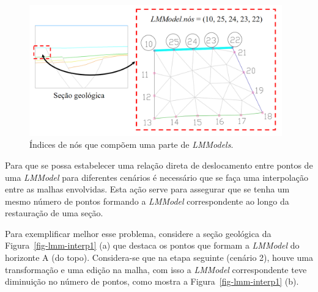 \begin{figure} [H]
  \begin{center}
    \includegraphics[width=310pt]{images/fig-lmm-mesh-boundary}
    \caption{Índices de nós que compõem uma parte de \textit{LMModels}.}\label{fig-lmm-mesh-boundary}
  \end{center}
\end{figure}

Para que se possa estabelecer uma relação direta de deslocamento entre pontos de uma \textit{LMModel} para diferentes cenários é necessário que se faça uma interpolação entre as malhas envolvidas. Esta ação serve para assegurar que se tenha um mesmo número de pontos formando a \textit{LMModel} correspondente ao longo da restauração de uma seção.

Para exemplificar melhor esse problema, considere a seção geológica da Figura~\ref{fig-lmm-interp1} (a) que destaca os pontos que formam a \textit{LMModel} do horizonte A (do topo). Considera-se que na etapa seguinte (cenário 2), houve uma transformação e uma edição na malha, com isso a \textit{LMModel} correspondente teve diminuição no número de pontos, como mostra a Figura~\ref{fig-lmm-interp1} (b).

